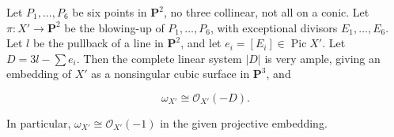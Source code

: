 Let $P_1, \ldots, P_6$ be six points in $\mathbf{P}^2$, no three collinear, not all on a conic. Let $\pi: X' \to \mathbf{P}^2$ be the blowing-up of $P_1, \ldots, P_6$, with exceptional divisors $E_1, \ldots, E_6$. Let $l$ be the pullback of a line in $\mathbf{P}^2$, and let $e_i = [E_i] \in \operatorname{Pic} X'$. Let $D = 3l - \sum e_i$. Then the complete linear system $|D|$ is very ample, giving an embedding of $X'$ as a nonsingular cubic surface in $\mathbf{P}^3$, and

$$\omega_{X'} \cong \mathcal{O}_{X'}(-D).$$

In particular, $\omega_{X'} \cong \mathcal{O}_{X'}(-1)$ in the given projective embedding.
